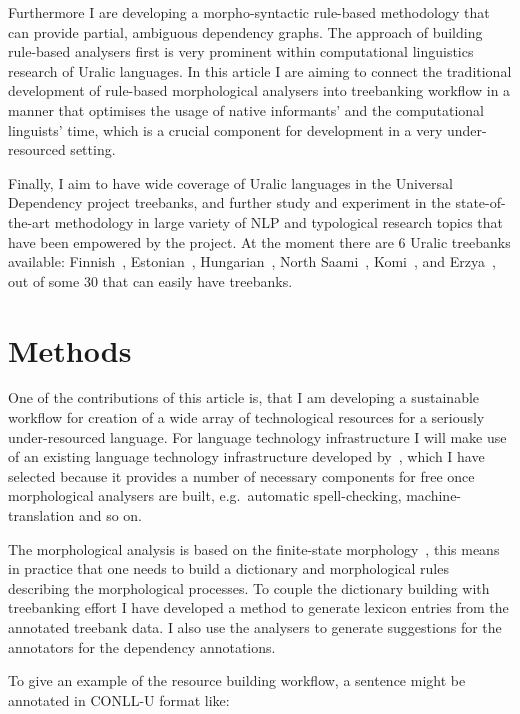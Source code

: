 \documentclass[11pt]{article}
\begin{document}
Furthermore I are developing a morpho-syntactic rule-based methodology that can
provide partial, ambiguous dependency graphs. The approach of building
rule-based analysers first is very prominent within computational linguistics
research of Uralic languages. In this article I are aiming to connect the
traditional development of rule-based morphological analysers into treebanking
workflow in a manner that optimises the usage of native informants' and the
computational linguists' time, which is a crucial component for development in
a very under-resourced setting.

Finally, I aim to have wide coverage of Uralic languages in the Universal
Dependency project treebanks, and further study and experiment in the
state-of-the-art methodology in large variety of NLP and typological research
topics that have been empowered by the project. At the moment there are 6 Uralic
treebanks available:
Finnish~\cite{haverinen2014building,voutilainen2012specifying},
Estonian~\cite{muischnek2016estonian},
Hungarian~\cite{vincze2010hungarian},
North Saami~\cite{sheyanova2017annotation},
Komi~\cite{partanen2018first}, and
Erzya~\cite{rueter2018towards}, out of some 30 that can easily have treebanks.

\section{Methods}
\label{sec:methods}

One of the contributions of this article is, that I am developing a sustainable
workflow for creation of a wide array of technological resources for a seriously
under-resourced language. For language technology infrastructure I will make
use of an existing language technology infrastructure developed
by~\cite{moshagen2014open}, which I have selected because it provides a number
of necessary components for free once morphological analysers are built, e.g.\
automatic spell-checking, machine-translation and so on.

The morphological analysis is based on the finite-state
morphology~\cite{beesley2003finite}, this means in practice that one needs to
build a dictionary and morphological rules describing the morphological
processes. To couple the dictionary building with treebanking effort I have
developed a method to generate lexicon entries from the annotated treebank data.
I also use the analysers to generate suggestions for the annotators for the
dependency annotations.

To give an example of the resource building workflow, a sentence might be
annotated in CONLL-U format like:
\end{document}
